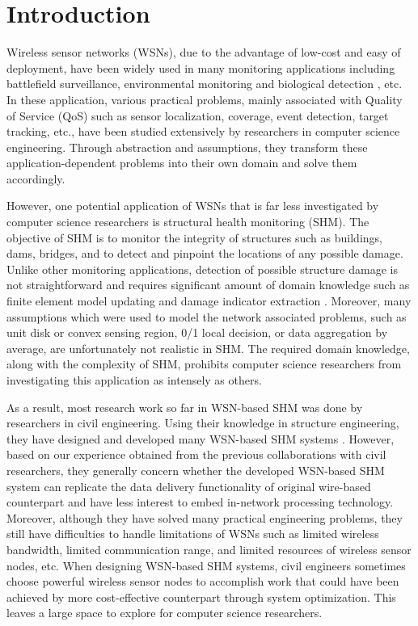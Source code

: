 \section{Introduction}
Wireless sensor networks (WSNs), due to the advantage of low-cost and easy of deployment, have been widely used in many monitoring applications including battlefield surveillance, environmental monitoring and biological detection \cite{wsnhabitat}\cite{lo:ban}, etc. In these application, various practical problems, mainly associated with Quality of Service (QoS) such as sensor localization, coverage, event detection, target tracking, etc., have been studied extensively by researchers in computer science engineering. Through abstraction and assumptions, they transform these application-dependent problems into their own domain and solve them accordingly.

However, one potential application of WSNs that is far less investigated by computer science researchers is structural health monitoring (SHM).  The objective of SHM is to monitor the integrity of structures such as buildings, dams, bridges, and to detect and pinpoint the locations of any possible damage. Unlike other monitoring applications, detection of possible structure damage is not straightforward and requires significant amount of domain knowledge such as finite element model updating and damage indicator extraction \cite{farrar1997overview}. Moreover, many assumptions which were used to model the network associated problems, such as unit disk or convex sensing region, 0/1 local decision, or data aggregation by average, are unfortunately not realistic in SHM.  The required domain knowledge, along with the complexity of SHM, prohibits computer science researchers from investigating this application as intensely as others.

As a result, most research work so far in WSN-based SHM was done by researchers in civil engineering.  Using their knowledge in structure engineering, they have designed and developed many WSN-based SHM systems \cite{lynch2003embedment}\cite{nagayama2008structural}. However, based on our experience obtained from the previous collaborations with civil researchers, they generally concern whether the developed WSN-based SHM system can replicate the data delivery functionality of original wire-based counterpart and have less interest to embed in-network processing technology. Moreover, although they have solved many practical engineering problems, they still have difficulties to handle limitations of WSNs such as limited wireless bandwidth, limited communication range, and limited resources of wireless sensor nodes, etc.  When designing WSN-based SHM systems, civil engineers sometimes choose powerful wireless sensor nodes to accomplish work that could have been achieved by more cost-effective counterpart through system optimization. This leaves a large space to explore for computer science researchers.


